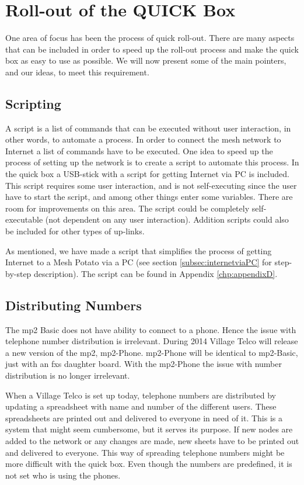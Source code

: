 \chapter{Roll-out of the QUICK Box}
\label{chp:manuals} 

One area of focus has been the process of quick roll-out. There are many aspects that can be included in order to speed up the roll-out process and make the \gls{quick} box as easy to use as possible. We will now present some of the main pointers, and our ideas, to meet this requirement.


\section{Scripting}
A script is a list of commands that can be executed without user interaction, in other words, to automate a process. In order to connect the mesh network to Internet a list of commands have to be executed. One idea to speed up the process of setting up the network is to create a script to automate this process. In the \gls{quick} box a USB-stick with a script for getting Internet via PC is included. This script requires some user interaction, and is not self-executing since the user have to start the script, and among other things enter some variables. There are room for improvements on this area. The script could be completely self-executable (not dependent on any user interaction). Addition scripts could also be included for other types of up-links. 

As mentioned, we have made a script that simplifies the process of getting Internet to a Mesh Potato via a PC (see section \ref{subsec:internetviaPC} for step-by-step description). The script can be found in Appendix \ref{chp:appendixD}. 

\section{Distributing Numbers}
The \gls{mp2} Basic does not have ability to connect to a phone. Hence the issue with telephone number distribution is irrelevant. During 2014 Village Telco will release a new version of the \gls{mp2}, \gls{mp2}-Phone. \gls{mp2}-Phone will be identical to \gls{mp2}-Basic, just with an \gls{fxs} daughter board. With the \gls{mp2}-Phone the issue with number distribution is no longer irrelevant. 

When a Village Telco is set up today, telephone numbers are distributed by updating a spreadsheet with name and number of the different users. These spreadsheets are printed out and delivered to everyone in need of it. This is a system that might seem cumbersome, but it serves its purpose. If new nodes are added to the network or any changes are made, new sheets have to be printed out and delivered to everyone. This way of spreading telephone numbers might be more difficult with the \gls{quick} box. Even though the numbers are predefined, it is not set who is using the phones.  

